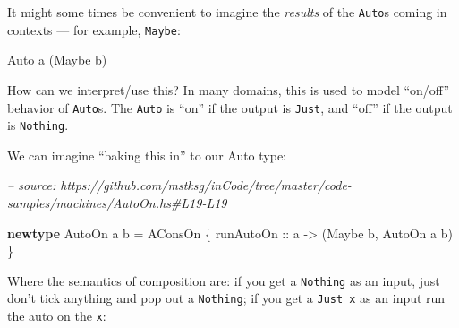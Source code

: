 \documentclass[]{article}
\newenvironment{Shaded}{}{}
\newcommand{\CommentTok}[1]{\textcolor[rgb]{0.38,0.63,0.69}{\textit{#1}}}
\newcommand{\DataTypeTok}[1]{\textcolor[rgb]{0.56,0.13,0.00}{#1}}
\newcommand{\FunctionTok}[1]{\textcolor[rgb]{0.02,0.16,0.49}{#1}}
\newcommand{\KeywordTok}[1]{\textcolor[rgb]{0.00,0.44,0.13}{\textbf{#1}}}
\newcommand{\NormalTok}[1]{#1}
\newcommand{\OtherTok}[1]{\textcolor[rgb]{0.00,0.44,0.13}{#1}}
\begin{document}
It might some times be convenient to imagine the \emph{results} of the
\texttt{Auto}s coming in contexts --- for example, \texttt{Maybe}:

\begin{Shaded}
\begin{Highlighting}[]
\DataTypeTok{Auto}\NormalTok{ a (}\DataTypeTok{Maybe}\NormalTok{ b)}
\end{Highlighting}
\end{Shaded}

How can we interpret/use this? In many domains, this is used to model ``on/off''
behavior of \texttt{Auto}s. The \texttt{Auto} is ``on'' if the output is
\texttt{Just}, and ``off'' if the output is \texttt{Nothing}.

We can imagine ``baking this in'' to our Auto type:

\begin{Shaded}
\begin{Highlighting}[]
\CommentTok{-- source: https://github.com/mstksg/inCode/tree/master/code-samples/machines/AutoOn.hs#L19-L19}

\KeywordTok{newtype} \DataTypeTok{AutoOn}\NormalTok{ a b }\FunctionTok{=} \DataTypeTok{AConsOn}\NormalTok{ \{}\OtherTok{ runAutoOn ::}\NormalTok{ a }\OtherTok{->}\NormalTok{ (}\DataTypeTok{Maybe}\NormalTok{ b, }\DataTypeTok{AutoOn}\NormalTok{ a b) \}}
\end{Highlighting}
\end{Shaded}

Where the semantics of composition are: if you get a \texttt{Nothing} as an
input, just don't tick anything and pop out a \texttt{Nothing}; if you get a
\texttt{Just\ x} as an input run the auto on the \texttt{x}:

\begin{Shaded}
\end{Shaded}
\end{document}
